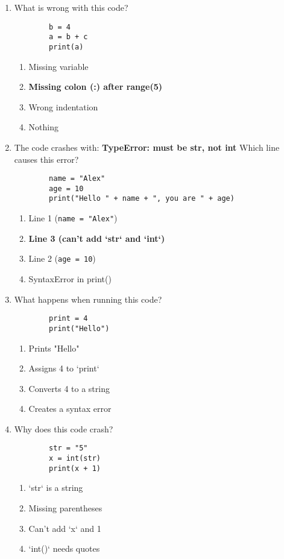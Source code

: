 \documentclass{article}
\begin{document}
    \begin{enumerate}
        \item What is wrong with this code?
        \begin{lstlisting}
        b = 4
        a = b + c
        print(a)
        \end{lstlisting}
        \begin{enumerate}[label=(\Alph*)]
            \item Missing variable
            \item \textbf{Missing colon (:) after range(5)}
            \item Wrong indentation
            \item Nothing
        \end{enumerate}

        \item The code crashes with:  
        \textbf{TypeError: must be str, not int}  
        Which line causes this error?  
        \begin{lstlisting}
        name = "Alex"
        age = 10
        print("Hello " + name + ", you are " + age)
        \end{lstlisting}

        \begin{enumerate}[label=(\Alph*)]
            \item Line 1 (\texttt{name = "Alex"})
            \item \textbf{Line 3 (can't add `str` and `int`)}
            \item Line 2 (\texttt{age = 10})
            \item SyntaxError in print()
        \end{enumerate}

        \item What happens when running this code?
        \begin{lstlisting}
        print = 4
        print("Hello")
        \end{lstlisting}
        \begin{enumerate}[label=(\Alph*)]
            \item Prints "Hello"
            \item Assigns 4 to `print`
            \item Converts 4 to a string
            \item Creates a syntax error
        \end{enumerate}

        \item Why does this code crash?
        \begin{lstlisting}
        str = "5"
        x = int(str)
        print(x + 1)
        \end{lstlisting}
        \begin{enumerate}[label=(\Alph*)]
            \item `str` is a string
            \item Missing parentheses
            \item Can't add `x` and 1
            \item `int()` needs quotes
        \end{enumerate}


\end{enumerate}
\end{document}
